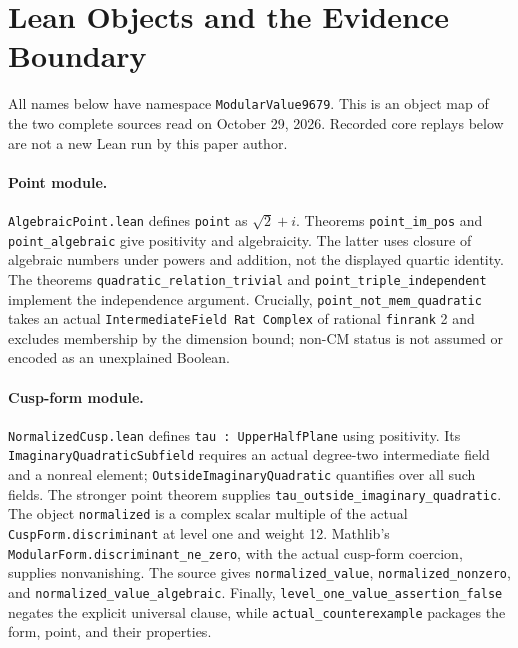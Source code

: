 \documentclass[11pt]{article}
\begin{document}
\section{Lean Objects and the Evidence Boundary}
\raggedright
\small
All names below have namespace \texttt{ModularValue9679}. This is an
object map of the two complete sources read on October 29, 2026.
Recorded core replays below are not a new Lean run by this paper author.
\paragraph{Point module.}
\texttt{AlgebraicPoint.lean} defines \texttt{point} as $\sqrt2+i$.
Theorems \texttt{point\_im\_pos} and \texttt{point\_algebraic} give
positivity and algebraicity. The latter uses closure of algebraic numbers
under powers and addition, not the displayed quartic identity.
The theorems \texttt{quadratic\_relation\_trivial} and
\texttt{point\_triple\_independent} implement the independence argument.
Crucially, \texttt{point\_not\_mem\_quadratic} takes an actual
\texttt{IntermediateField Rat Complex} of rational \texttt{finrank} 2
and excludes membership by the dimension bound; non-CM status is not
assumed or encoded as an unexplained Boolean.
\paragraph{Cusp-form module.}
\texttt{NormalizedCusp.lean} defines \texttt{tau : UpperHalfPlane}
using positivity. Its \texttt{ImaginaryQuadraticSubfield} requires an
actual degree-two intermediate field and a nonreal element;
\texttt{OutsideImaginaryQuadratic} quantifies over all such fields.
The stronger point theorem supplies \texttt{tau\_outside\_imaginary\_quadratic}.
The object \texttt{normalized} is a complex scalar multiple of the actual
\texttt{CuspForm.discriminant} at level one and weight 12.
Mathlib's \texttt{ModularForm.discriminant\_ne\_zero}, with the actual
cusp-form coercion, supplies nonvanishing. The source gives
\texttt{normalized\_value}, \texttt{normalized\_nonzero}, and
\texttt{normalized\_value\_algebraic}. Finally,
\texttt{level\_one\_value\_assertion\_false} negates the explicit
universal clause, while \texttt{actual\_counterexample} packages the
form, point, and their properties.
\end{document}
